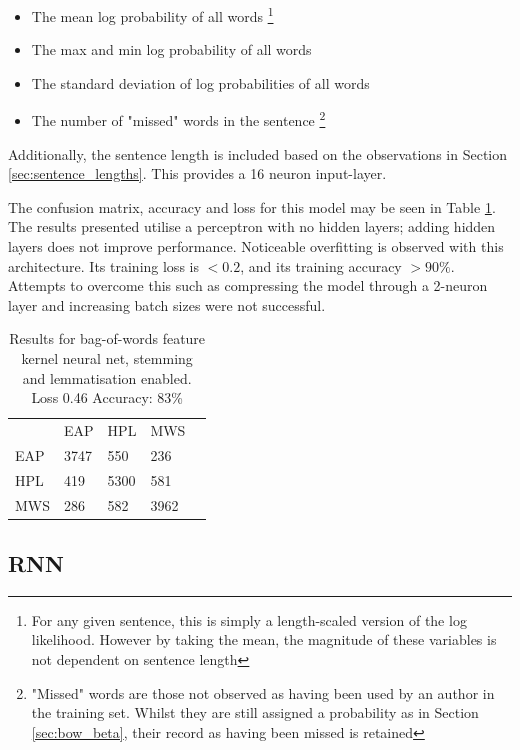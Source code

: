  \begin{itemize}
  \item The mean log probability of all words \footnote{For any given sentence, this is simply a length-scaled version of the log likelihood. However by taking the mean, the magnitude of these variables is not dependent on sentence length}
  \item The max and min log probability of all words
  \item The standard deviation of log probabilities of all words
  \item The number of "missed" words in the sentence \footnote{"Missed" words are those not observed as having been used by an author in the training set. Whilst they are still assigned a probability as in Section \ref{sec:bow_beta}, their record as having been missed is retained}
  \end{itemize}
  
 Additionally, the sentence length is included based on the observations in Section \ref{sec:sentence_lengths}. This provides a 16 neuron input-layer.
 
 The confusion matrix, accuracy and loss for this model may be seen in Table \ref{tab:bow_nn_res}. The results presented utilise a perceptron with no hidden layers; adding hidden layers does not improve performance. Noticeable overfitting is observed with this architecture. Its training loss is $<0.2$, and its training accuracy $>90\%$. Attempts to overcome this such as compressing the model through a 2-neuron layer and increasing batch sizes were not successful.
  
\begin{table}[h]
\centering
\begin{tabular}{m{1cm}|m{1cm}|m{1cm}|m{1cm}|m{0cm}}
\multicolumn{1}{m{1cm}}{} & \multicolumn{1}{m{1cm}}{EAP} & \multicolumn{1}{m{1cm}}{HPL} & \multicolumn{1}{m{1cm}}{MWS} &\\[5pt]
\cline{2-4}
EAP & 3747 & 550 & 236 & \\[5pt]
\cline{2-4}
HPL & 419 & 5300 & 581 & \\[5pt]
\cline{2-4}
MWS & 286 & 582 & 3962 & \\[5pt]
\cline{2-4}
\end{tabular}
\caption{Results for bag-of-words feature kernel neural net, stemming and lemmatisation enabled.\\Loss 0.46 Accuracy: 83\% }
\label{tab:bow_nn_res}
\end{table}

  \subsection{RNN}
  \label{sec:rnn_grid_search}

